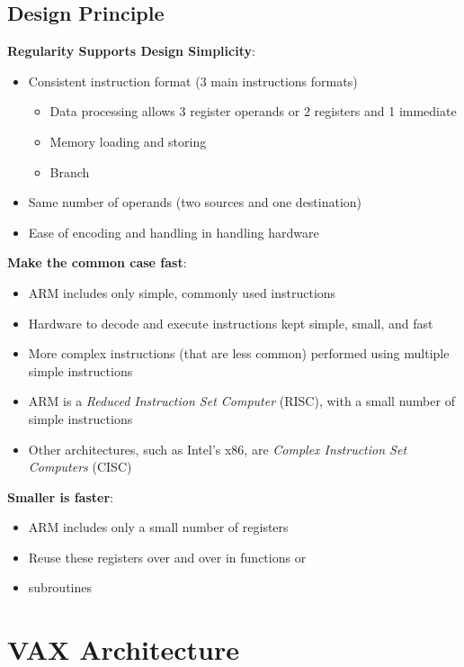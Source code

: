 \documentclass[12pt]{article}
\theoremstyle{definition}
\begin{document}
  \subsection{Design Principle}
  \textbf{Regularity Supports Design Simplicity}:
  \begin{itemize}
    \item Consistent instruction format (3 main instructions formats)
    \begin{itemize}
      \item Data processing allows 3 register operands or 2 registers and 1 immediate
      \item Memory loading and storing
      \item Branch
    \end{itemize}
    \item Same number of operands (two sources and one destination)
    \item Ease of encoding and handling in handling hardware
  \end{itemize}

  \textbf{Make the common case fast}:
  \begin{itemize}
    \item ARM includes only simple, commonly used instructions
    \item Hardware to decode and execute instructions kept simple, small, and fast
    \item More complex instructions (that are less common) performed using multiple simple instructions
    \item ARM is a \emph{Reduced Instruction Set Computer} (RISC), with a small number of simple instructions
    \item Other architectures, such as Intel's x86, are \emph{Complex Instruction Set Computers} (CISC)
  \end{itemize}

  \textbf{Smaller is faster}:
  \begin{itemize}
    \item ARM includes only a small number of registers
    \item Reuse these registers over and over in functions or
    \item subroutines
  \end{itemize}

  \newpage
  \section{VAX Architecture}
\end{document}
